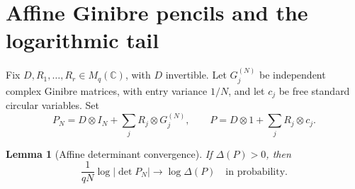 \documentclass[11pt]{article}
\newtheorem{lemma}[theorem]{Lemma}
\newcommand{\C}{\mathbb C}
\begin{document}
\section{Affine Ginibre pencils and the logarithmic tail}\label{sec:affine}
Fix $D,R_1,\ldots,R_r\in M_q(\C)$, with $D$ invertible. Let $G_j^{(N)}$ be independent complex Ginibre matrices, with entry variance $1/N$, and let $c_j$ be free standard circular variables. Set
\[
 P_N=D\otimes I_N+\sum_jR_j\otimes G_j^{(N)},\qquad
 P=D\otimes1+\sum_jR_j\otimes c_j.
\]
\begin{lemma}[Affine determinant convergence]\label{lem:affine}
If $\Delta(P)>0$, then
\begin{equation}\label{eq:logconv}
 \frac1{qN}\log|\det P_N|\longrightarrow\log\Delta(P)
 \quad\text{in probability}.
\end{equation}
\end{lemma}
\end{document}
